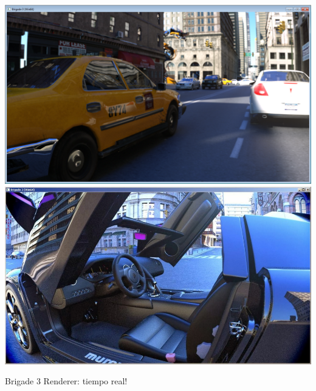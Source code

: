 \documentclass[spanish,unknownkeysallowed,10pt]{beamer}
\begin{document}
\begin{frame}{}
\includegraphics[scale = 0.15]{../figures/brigade3}
\includegraphics[scale = 0.15]{../figures/brigade3_2}

Brigade 3 Renderer: tiempo real!


\end{frame}
\end{document}
